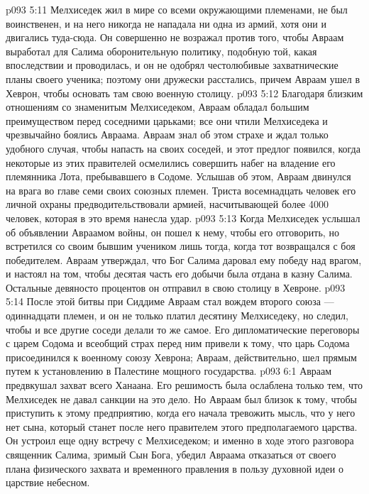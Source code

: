 \vs p093 5:11 Мелхиседек жил в мире со всеми окружающими племенами, не был воинственен, и на него никогда не нападала ни одна из армий, хотя они и двигались туда\hyp{}сюда. Он совершенно не возражал против того, чтобы Авраам выработал для Салима оборонительную политику, подобную той, какая впоследствии и проводилась, и он не одобрял честолюбивые захватнические планы своего ученика; поэтому они дружески расстались, причем Авраам ушел в Хеврон, чтобы основать там свою военную столицу.
\vs p093 5:12 Благодаря близким отношениям со знаменитым Мелхиседеком, Авраам обладал большим преимуществом перед соседними царьками; все они чтили Мелхиседека и чрезвычайно боялись Авраама. Авраам знал об этом страхе и ждал только удобного случая, чтобы напасть на своих соседей, и этот предлог появился, когда некоторые из этих правителей осмелились совершить набег на владение его племянника Лота, пребывавшего в Содоме. Услышав об этом, Авраам двинулся на врага во главе семи своих союзных племен. Триста восемнадцать человек его личной охраны предводительствовали армией, насчитывающей более 4000 человек, которая в это время нанесла удар.
\vs p093 5:13 Когда Мелхиседек услышал об объявлении Авраамом войны, он пошел к нему, чтобы его отговорить, но встретился со своим бывшим учеником лишь тогда, когда тот возвращался с боя победителем. Авраам утверждал, что Бог Салима даровал ему победу над врагом, и настоял на том, чтобы десятая часть его добычи была отдана в казну Салима. Остальные девяносто процентов он отправил в свою столицу в Хевроне.
\vs p093 5:14 После этой битвы при Сиддиме Авраам стал вождем второго союза --- одиннадцати племен, и он не только платил десятину Мелхиседеку, но следил, чтобы и все другие соседи делали то же самое. Его дипломатические переговоры с царем Содома и всеобщий страх перед ним привели к тому, что царь Содома присоединился к военному союзу Хеврона; Авраам, действительно, шел прямым путем к установлению в Палестине мощного государства.
\vs p093 6:1 Авраам предвкушал захват всего Ханаана. Его решимость была ослаблена только тем, что Мелхиседек не давал санкции на это дело. Но Авраам был близок к тому, чтобы приступить к этому предприятию, когда его начала тревожить мысль, что у него нет сына, который станет после него правителем этого предполагаемого царства. Он устроил еще одну встречу с Мелхиседеком; и именно в ходе этого разговора священник Салима, зримый Сын Бога, убедил Авраама отказаться от своего плана физического захвата и временного правления в пользу духовной идеи о царствие небесном.

